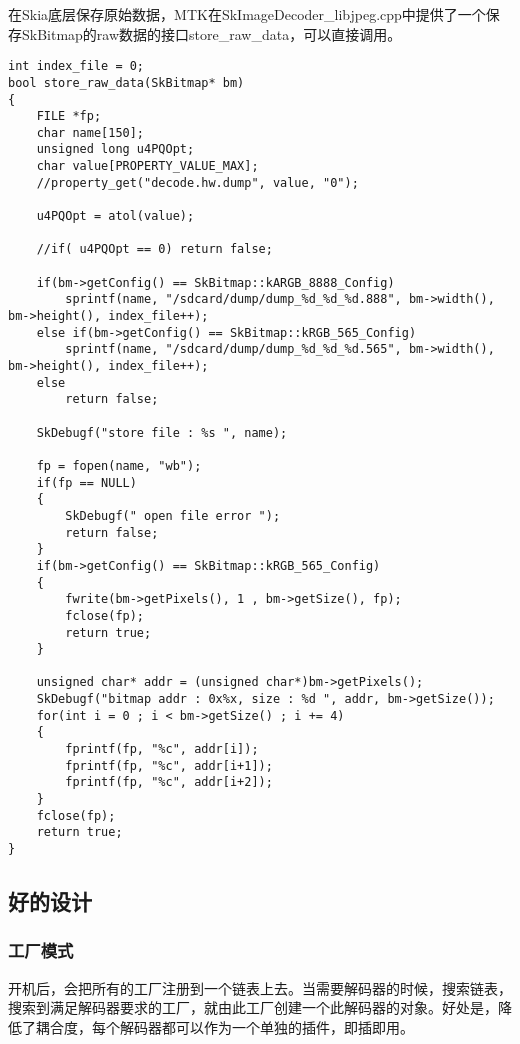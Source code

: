 在Skia底层保存原始数据，MTK在SkImageDecoder\_libjpeg.cpp中提供了一个保存SkBitmap的raw数据的接口store\_raw\_data，可以直接调用。
\begin{lstlisting}[language={[ANSI]C},label=skia-deug-raw,caption=获取SkBitmap数据]
int index_file = 0;
bool store_raw_data(SkBitmap* bm)
{
    FILE *fp;
    char name[150];
    unsigned long u4PQOpt;
    char value[PROPERTY_VALUE_MAX];
    //property_get("decode.hw.dump", value, "0");

    u4PQOpt = atol(value);

    //if( u4PQOpt == 0) return false;

    if(bm->getConfig() == SkBitmap::kARGB_8888_Config)
        sprintf(name, "/sdcard/dump/dump_%d_%d_%d.888", bm->width(), bm->height(), index_file++);
    else if(bm->getConfig() == SkBitmap::kRGB_565_Config)
        sprintf(name, "/sdcard/dump/dump_%d_%d_%d.565", bm->width(), bm->height(), index_file++);
    else
        return false;

    SkDebugf("store file : %s ", name);

    fp = fopen(name, "wb");
    if(fp == NULL)
    {
        SkDebugf(" open file error ");
        return false;
    }
    if(bm->getConfig() == SkBitmap::kRGB_565_Config)
    {
        fwrite(bm->getPixels(), 1 , bm->getSize(), fp);
        fclose(fp);
        return true;
    }

    unsigned char* addr = (unsigned char*)bm->getPixels();
    SkDebugf("bitmap addr : 0x%x, size : %d ", addr, bm->getSize());
    for(int i = 0 ; i < bm->getSize() ; i += 4)
    {
        fprintf(fp, "%c", addr[i]);
        fprintf(fp, "%c", addr[i+1]);
        fprintf(fp, "%c", addr[i+2]);
    }
    fclose(fp);
    return true;
}

\end{lstlisting}

\subsection{好的设计}
\label{sec:skia-design}

\subsubsection{工厂模式}
\label{sec:skia-factory}

开机后，会把所有的工厂注册到一个链表上去。当需要解码器的时候，搜索链表，搜索到满足解码器要求的工厂，就由此工厂创建一个此解码器的对象。好处是，降低了耦合度，每个解码器都可以作为一个单独的插件，即插即用。


